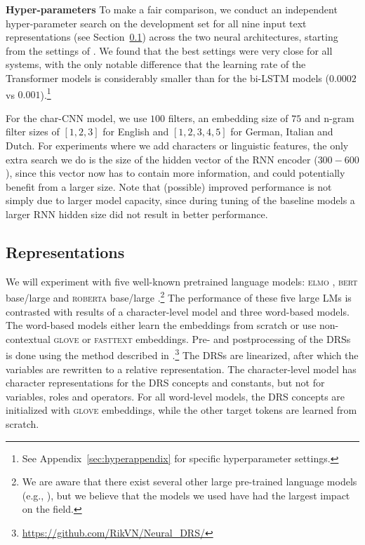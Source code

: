 \documentclass[11pt,a4paper]{article}
\newcommand{\bert}{\textsc{bert}}
\newcommand{\roberta}{\textsc{roberta}}
\newcommand{\elmo}{\textsc{elmo}}
\newcommand{\glove}{\textsc{glove}}
\newcommand{\fasttext}{\textsc{fasttext}}
\newcommand{\inlineheader}[1]{\vspace{0.06cm}
\noindent\textbf{#1}\quad
}
\begin{document}
\inlineheader{Hyper-parameters} To make a fair comparison, we conduct an independent hyper-parameter search on the development set for all nine input text representations (see Section~\ref{sec:lms}) across the two neural architectures, starting from the settings of \citet{van-noord-etal-2019-linguistic}. We found that the best settings were very close for all systems, with the only notable difference that the learning rate of the Transformer models is considerably smaller than for the bi-LSTM models ($0.0002$ vs $0.001$).\footnote{See Appendix~\ref{sec:hyperappendix} for specific hyperparameter settings.}

For the char-CNN model, we use $100$ filters, an embedding size of $75$ and n-gram filter sizes of $[1, 2, 3]$ for English and $[1, 2, 3, 4, 5]$ for German, Italian and Dutch. For experiments where we add characters or linguistic features, the only extra search we do is the size of the hidden vector of the RNN encoder ($300 - 600$), since this vector now has to contain more information, and could potentially benefit from a larger size. Note that (possible) improved performance is not simply due to larger model capacity, since during tuning of the baseline models a larger RNN hidden size did not result in better performance.

\subsection{Representations}
\label{sec:lms}


We will experiment with five well-known pretrained language models: \elmo{} \citep{Peters:2018}, \bert{} base/large \citep{bert:19} and \roberta{} base/large \citep{roberta_arxiv:19}.\footnote{We are aware that there exist several other large pre-trained language models (e.g., \citealp{yang2019xlnet,2019t5,clark2020electra}), but we believe that the models we used have had the largest impact on the field.} The performance of these five large LMs is contrasted with results of a character-level model and three word-based models. The word-based models either learn the embeddings from scratch or use non-contextual \glove{} \citep{glove:14} or \fasttext{} \citep{grave2018learning} embeddings. 
Pre- and postprocessing of the DRSs is done using the method described in \citet{drstacl:18}.\footnote{\url{https://github.com/RikVN/Neural_DRS/}} The DRSs are linearized, after which the variables are rewritten to a relative representation. The character-level model has character representations for the DRS concepts and constants, but not for variables, roles and operators. For all word-level models, the DRS concepts are initialized with \glove{} embeddings, while the other target tokens are learned from scratch.
\end{document}
